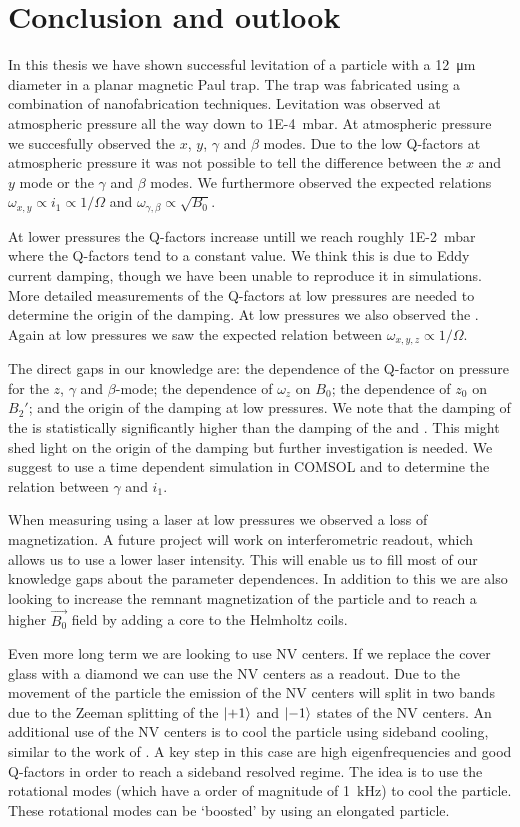\chapter{Conclusion and outlook}
\label{chap:conclusion}
In this thesis we have shown successful levitation of a  particle with a \qty{12}{\micro\meter} diameter in a planar magnetic Paul trap. The trap was fabricated using a combination of nanofabrication techniques. Levitation was observed at atmospheric pressure all the way down to \qty{1E-4}{\milli\bar}. At atmospheric pressure we succesfully observed the $x$, $y$, $\gamma$ and $\beta$ modes. Due to the low Q-factors at atmospheric pressure it was not possible to tell the difference between the $x$ and $y$ mode or the $\gamma$ and $\beta$ modes. We furthermore observed the expected relations $\omega_{x,y} \propto i_1 \propto 1/\Omega$ and $\omega_{\gamma,\beta} \propto \sqrt{B_0}$.

At lower pressures the Q-factors increase untill we reach roughly \qty{1E-2}{\milli\bar} where the Q-factors tend to a constant value. We think this is due to Eddy current damping, though we have been unable to reproduce it in simulations. More detailed measurements of the Q-factors at low pressures are needed to determine the origin of the damping. At low pressures we also observed the \zmode. Again at low pressures we saw the expected relation between $\omega_{x,y,z} \propto 1/\Omega$.

The direct gaps in our knowledge are: the dependence of the Q-factor on pressure for the $z$, $\gamma$ and $\beta$-mode; the dependence of $\omega_z$ on $B_0$; the dependence of $z_0$ on $B_2'$; and the origin of the damping at low pressures. We note that the damping of the \zmode is statistically significantly higher than the damping of the \xmode and \ymode. This might shed light on the origin of the damping but further investigation is needed. We suggest to use a time dependent simulation in COMSOL and to determine the relation between $\gamma$ and $i_1$.

When measuring using a laser at low pressures we observed a loss of magnetization. A future project will work on interferometric readout, which allows us to use a lower laser intensity. This will enable us to fill most of our knowledge gaps about the parameter dependences. In addition to this we are also looking to increase the remnant magnetization of the particle and to reach a higher $\vec{B_0}$ field by adding a core to the Helmholtz coils.

Even more long term we are looking to use NV centers. If we replace the cover glass with a diamond we can use the NV centers as a readout. Due to the movement of the particle the emission of the NV centers will split in two bands due to the Zeeman splitting of the $\ket{+1}$ and $\ket{-1}$ states of the NV centers. An additional use of the NV centers is to cool the particle using sideband cooling, similar to the work of \textcite{delord_spin-cooling_2020}. A key step in this case are high eigenfrequencies and good Q-factors in order to reach a sideband resolved regime. The idea is to use the rotational modes (which have a order of magnitude of \qty{1}{\kilo\hertz}) to cool the particle. These rotational modes can be `boosted' by using an elongated particle\cite{huillery_spin-mechanics_2020}.
